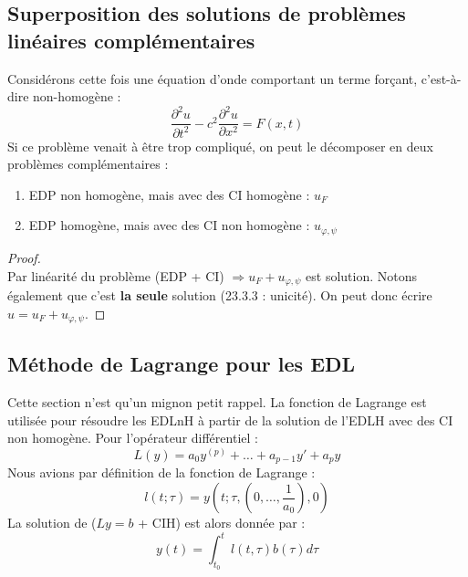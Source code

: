 \documentclass[british,french,11pt, a4paper, openany]{book}
\begin{document}
			\subsection{Superposition des solutions de problèmes linéaires complémentaires}
			Considérons cette fois une équation d'onde comportant un terme forçant, c'est-à-dire non-homogène :
			\begin{equation}
				\dfrac{\partial^2u}{\partial t^2} - c^2\dfrac{\partial^2u}{\partial x^2} = F(x,t)
			\end{equation}
			Si ce problème venait à être trop compliqué, on peut le décomposer en deux problèmes complémentaires :
			\begin{enumerate}
				\item EDP non homogène, mais avec des CI homogène : $u_F$
				\item EDP homogène, mais avec des CI non homogène : $u_{\varphi,\psi}$
			\end{enumerate}
			\begin{proof}
				\ \\
				Par linéarité du problème (EDP + CI) $\Rightarrow u_F + u_{\varphi,\psi}$ est solution. Notons également que c'est \textbf{la seule} solution (23.3.3 : unicité). On peut donc écrire $u = u_F + u_{\varphi,\psi}$.
			\end{proof}
																
			\subsection{Méthode de Lagrange pour les EDL}
			Cette section n'est qu'un mignon petit rappel. La fonction de Lagrange est utilisée pour résoudre les EDLnH à partir de la solution de l'EDLH avec des CI non homogène. Pour l'opérateur différentiel :
			\begin{equation}
				L(y) = a_0 y^{(p)} + \dots + a_{p-1}y' + a_p y
			\end{equation}
			Nous avions par définition de la fonction de Lagrange :
			\begin{equation}
				l(t;\tau) = y(t;\tau,(0,\dots, \frac{1}{a_0}),0)
			\end{equation}
			La solution de ($Ly = b$ + CIH) est alors donnée par :
			\begin{equation}
				y(t) = \int_{t_0}^t l(t,\tau)b(\tau)d\tau
			\end{equation}
																
\end{document}

